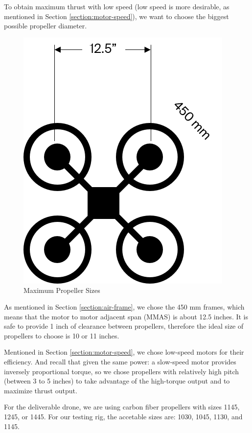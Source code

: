 To obtain maximum thrust with low speed (low speed is more desirable, as mentioned in Section \ref{section:motor-speed}), we want to choose the biggest possible propeller diameter.

\begin{figure}[H]
    \centering
    \includegraphics[scale=0.5]{img/framepropsize}
    \caption{Maximum Propeller Sizes}
    \label{fig:framepropsize}
\end{figure}

As mentioned in Section \ref{section:air-frame}, we chose the 450 mm frames, which means that the motor to motor 
adjacent span (MMAS) is about 12.5 inches. It is safe to provide 1 inch of clearance between propellers, 
therefore the ideal size of propellers to choose is 10 or 11 inches.

Mentioned in Section \ref{section:motor-speed}, we chose low-speed motors for their efficiency. And recall that 
given the same power: a slow-speed motor provides inversely proportional torque, so we chose propellers 
with relatively high pitch (between 3 to 5 inches) to take advantage of the high-torque output and to
maximize thrust output.

For the deliverable drone, we are using carbon fiber propellers with sizes 1145, 1245, or 1445. For our testing rig, the accetable sizes are: 1030, 1045, 1130, and 1145.

